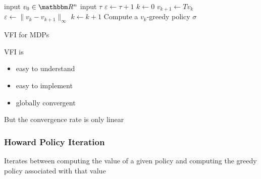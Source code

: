 \documentclass[xcolor=dvipsnames]{beamer}
\newcommand{\RR}{\mathbbm R}
\renewcommand{\epsilon}{\varepsilon}
\newcommand{\1}{\mathbbm 1}
\begin{document}
\begin{frame}
    
{\small 
    \begin{algorithm}[H]
    \DontPrintSemicolon
    input $v_0 \in \RR^n$\;
    \vspace{0.3em}
    input $\tau$\;
    \vspace{0.3em}
    $\epsilon \leftarrow \tau + 1$ \;
    \vspace{0.3em}
    $k \leftarrow 0$ \;
    \vspace{0.3em}
    \While{$\epsilon > \tau $}
    {
        $v_{k+1} \leftarrow Tv_k$ \;
    \vspace{0.3em}
        $\epsilon \leftarrow \| v_k - v_{k+1} \|_\infty$ \;
    \vspace{0.3em}
        $k \leftarrow k + 1$ \;
    \vspace{0.3em}
    }
    \vspace{0.3em}
    Compute a $v_k$-greedy policy $\sigma$ \;
    \vspace{0.3em}
    \Return{$\sigma$}
    \vspace{0.3em}
    \caption{VFI for MDPs}
    \end{algorithm}
}

\end{frame}

\begin{frame}
    

    VFI is 
    \begin{itemize}
        \vspace{0.5em}
        \item easy to understand
        \vspace{0.5em}
        \item easy to implement 
        \vspace{0.5em}
        \item globally convergent
    \end{itemize}

    \vspace{0.5em}
    \vspace{0.5em}
    \vspace{0.5em}
    \vspace{0.5em}
    But the convergence rate is only linear  

\end{frame}


\begin{frame}
    \frametitle{Howard Policy Iteration}

    \begin{figure}
       \begin{center}
           \scalebox{0.7}{}
        \vspace{1em}
       \end{center}
    \end{figure}

    Iterates between computing the value of a given policy
    and computing the greedy policy associated with that value

\end{frame}
\end{document}
